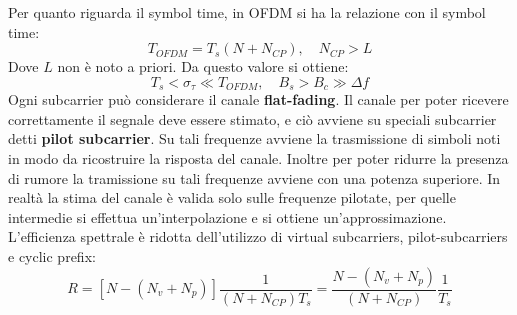 Per quanto riguarda il symbol time, in OFDM si ha la relazione con il symbol time:
\[
    T_{OFDM} = T_s(N+N_{CP}), \quad N_{CP} > L
\]  
Dove $L$ non è noto a priori.
Da questo valore si ottiene:
\[
    T_s < \sigma_{\tau} \ll T_{OFDM}, \quad B_s > B_c \gg \Delta f
\]
Ogni subcarrier può considerare il canale \textbf{flat-fading}. Il canale per poter ricevere correttamente il segnale deve essere stimato, e ciò avviene su speciali subcarrier detti \textbf{pilot subcarrier}. Su tali frequenze avviene la trasmissione di simboli noti in modo da ricostruire la risposta del canale. Inoltre per poter ridurre la presenza di rumore la tramissione su tali frequenze avviene con una potenza superiore. In realtà la stima del canale è valida solo sulle frequenze pilotate, per quelle intermedie si effettua un'interpolazione e si ottiene un'approssimazione.
L'efficienza spettrale è ridotta dell'utilizzo di virtual subcarriers, pilot-subcarriers e cyclic prefix:
\[
    R = \left[N - (N_v + N_p) \right]\frac{1}{(N+N_{CP})T_s} = \frac{N - (N_v + N_p)}{(N+N_{CP})} \frac{1}{T_s}
\]



\makeatletter
{}
\makeatother


